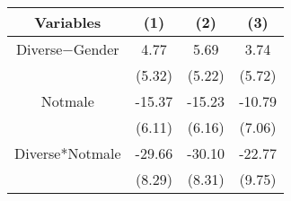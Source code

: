 \begin{table}[htbp]
    \begin{tabular}{c c c c}
    \toprule
    \textbf{Variables} & \textbf{(1)} & \textbf{(2)} & \textbf{(3)}         \\ 
\midrule
Diverse$-$Gender            &     4.77    &    5.69                               &  3.74  \\
                            &     (5.32)  &    (5.22)                             &  (5.72) \\

Notmale                  &      -15.37\sym{**} &    -15.23\sym{**}             &  -10.79  \\
                            &      (6.11)         &    (6.16)                     &  (7.06) \\
Diverse*Notmale         &      -29.66\sym{***}   &  -30.10\sym{***}            &  -22.77\sym{**}\\
                            &      (8.29)         &    (8.31)                     &  (9.75) \\



\end{tabular}
\end{table}
